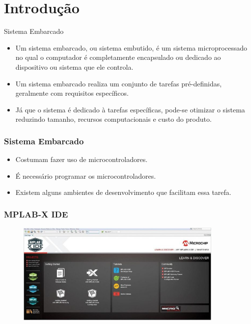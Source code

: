 \section{Introdução}

\begin{frame}{Sistema Embarcado}
	\begin{itemize}
			\item 	Um sistema embarcado, ou sistema embutido, é um sistema 
			microprocessado no qual o computador é completamente encapsulado
			ou dedicado ao dispositivo ou sistema que ele controla.

			\item Um sistema embarcado realiza um conjunto de tarefas 
			pré-definidas, geralmente com requisitos específicos.

			\item Já que o sistema é dedicado à tarefas específicas, 
			pode-se otimizar o sistema reduzindo tamanho, recursos 
			computacionais e custo do produto.
	\end{itemize}
\end{frame}

\begin{frame}
    \frametitle{Sistema Embarcado}
    \begin{itemize}
        \item Costumam fazer uso de microcontroladores.
        \item É necessário programar os microcontroladores.
        \item Existem alguns ambientes de desenvolvimento que facilitam
        essa tarefa.
	\end{itemize}

\end{frame}

\begin{frame}
	\frametitle{MPLAB-X IDE}
	\begin{figure}[htbp]
		\centering
		\includegraphics[width=0.9\textwidth]{images/mplab.jpg}
	\end{figure}
\end{frame}

